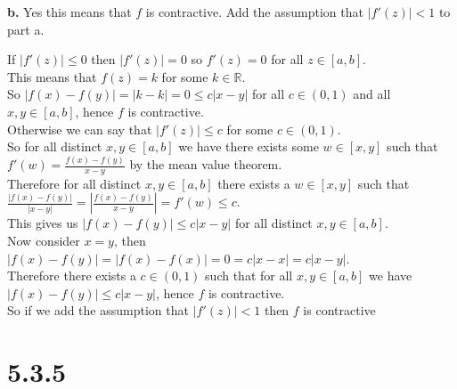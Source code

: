 \documentclass{article}
\begin{document}
{\Large\textbf{b.}} Yes this means that $f$ is contractive. Add the assumption that $|f'(z)| < 1$ to part a.
\begin{center}
    \doublespacing
    If $|f'(z)|\leq 0$ then $|f'(z)| = 0$ so $f'(z) = 0$ for all $z\in [a, b]$.
    \\This means that $f(z) = k$ for some $k\in\mathbb{R}$.
    \\So $|f(x) - f(y)| = |k - k| = 0\leq c|x - y|$ for all $c\in (0, 1)$ and all $x, y\in [a, b]$, hence $f$ is contractive.
    \\Otherwise we can say that $|f'(z)|\leq c$ for some $c\in (0, 1)$.
    \\So for all distinct $x, y\in [a, b]$ we have there exists some $w\in [x, y]$ such that $f'(w) =\frac{f(x) - f(y)}{x - y}$ by the mean value theorem.
    \\Therefore for all distinct $x, y\in [a, b]$ there exists a $w\in [x, y]$ such that $\frac{|f(x) - f(y)|}{|x - y|} = |\frac{f(x) - f(y)}{x - y}| = f'(w)\leq c$.
    \\This gives us $|f(x) - f(y)|\leq c|x - y|$ for all distinct $x, y\in [a, b]$.
    \\Now consider $x = y$, then $|f(x) - f(y)| = |f(x) - f(x)| = 0 = c|x - x| = c|x - y|$.
    \\Therefore there exists a $c\in (0, 1)$ such that for all $x, y\in [a, b]$ we have $|f(x) - f(y)|\leq c|x - y|$, hence $f$ is contractive.
    \\So if we add the assumption that $|f'(z)| < 1$ then $f$ is contractive \qedsymbol
\end{center}


\newpage
\section*{5.3.5}
\end{document}
